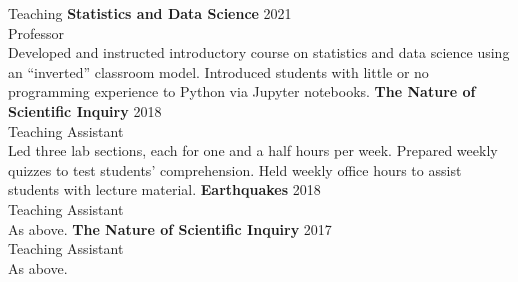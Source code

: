\begin{rSection}{Teaching}
	\textbf{Statistics and Data Science} \hfill 2021\\
	Professor\\
	Developed and instructed introductory course on statistics and data science using an ``inverted'' classroom model. Introduced students with little or no programming experience to Python via Jupyter notebooks.
	\smallbreak
	\textbf{The Nature of Scientific Inquiry} \hfill 2018\\
	Teaching Assistant\\
	Led three lab sections, each for one and a half hours per week. Prepared weekly quizzes to test students' comprehension. Held weekly office hours to assist students with lecture material.
	\smallbreak
	\textbf{Earthquakes} \hfill 2018\\
	Teaching Assistant\\
	As above.
	\smallbreak
	\textbf{The Nature of Scientific Inquiry} \hfill 2017\\
	Teaching Assistant\\
	As above.
\end{rSection}
